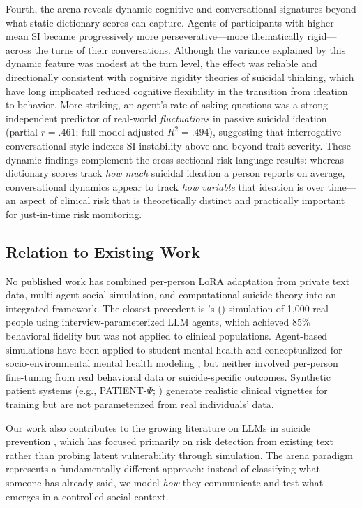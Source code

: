 \documentclass[review,12pt,authoryear]{elsarticle}
\begin{document}
Fourth, the arena reveals dynamic cognitive and conversational signatures beyond what static dictionary scores can capture. Agents of participants with higher mean SI became progressively more perseverative---more thematically rigid---across the turns of their conversations. Although the variance explained by this dynamic feature was modest at the turn level, the effect was reliable and directionally consistent with cognitive rigidity theories of suicidal thinking, which have long implicated reduced cognitive flexibility in the transition from ideation to behavior. More striking, an agent's rate of asking questions was a strong independent predictor of real-world \textit{fluctuations} in passive suicidal ideation (partial $r = .461$; full model adjusted $R^2 = .494$), suggesting that interrogative conversational style indexes SI instability above and beyond trait severity. These dynamic findings complement the cross-sectional risk language results: whereas dictionary scores track \textit{how much} suicidal ideation a person reports on average, conversational dynamics appear to track \textit{how variable} that ideation is over time---an aspect of clinical risk that is theoretically distinct and practically important for just-in-time risk monitoring.

\subsection{Relation to Existing Work}

No published work has combined per-person LoRA adaptation from private text data, multi-agent social simulation, and computational suicide theory into an integrated framework. The closest precedent is \citeauthor{park2024generative}'s (\citeyear{park2024generative}) simulation of 1,000 real people using interview-parameterized LLM agents, which achieved 85\% behavioral fidelity but was not applied to clinical populations. Agent-based simulations have been applied to student mental health \citep{zhao2025studentlife} and conceptualized for socio-environmental mental health modeling \citep{achterberg2024modelling}, but neither involved per-person fine-tuning from real behavioral data or suicide-specific outcomes. Synthetic patient systems (e.g., PATIENT-$\Psi$; \citealt{wang2024patient}) generate realistic clinical vignettes for training but are not parameterized from real individuals' data.

Our work also contributes to the growing literature on LLMs in suicide prevention \citep{holmes2025scoping, levkovich2023suicide}, which has focused primarily on risk detection from existing text rather than probing latent vulnerability through simulation. The arena paradigm represents a fundamentally different approach: instead of classifying what someone has already said, we model \textit{how} they communicate and test what emerges in a controlled social context.
\end{document}
